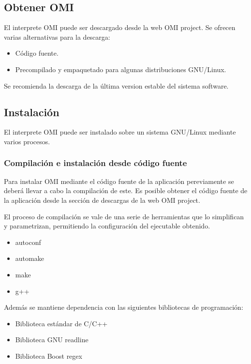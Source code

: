 \subsection{Obtener OMI}
El interprete OMI puede ser descargado desde la web OMI project. Se ofrecen varias 
alternativas para la descarga:

\begin{itemize}
\item Código fuente.
\item Precompilado y empaquetado para algunas distribuciones GNU/Linux.
\end{itemize}

Se recomienda la descarga de la última version estable del sistema software. 
 
\subsection{Instalación}
El interprete OMI puede ser instalado sobre un sistema GNU/Linux mediante varios procesos. 

\subsubsection{Compilación e instalación desde código fuente} \label{sec:compile}
Para instalar OMI mediante el código fuente de la aplicación pereviamente se deberá llevar a cabo la compilación de este. 
Es posible obtener el código fuente de la aplicación desde la sección de descargas de la web OMI project. 

El proceso de compilación se vale de una serie de herramientas que lo simplifican y parametrizan, permitiendo la configuración
del ejecutable obtenido.

\begin{itemize}
\item autoconf
\item automake
\item make
\item g++
\end{itemize}

Además se mantiene dependencia con las siguientes bibliotecas de programación:

\begin{itemize}
\item Biblioteca estándar de C/C++
\item Biblioteca GNU readline
\item Biblioteca Boost regex
\end{itemize}

